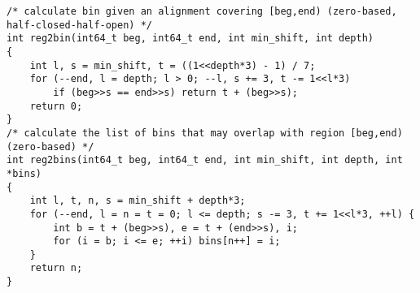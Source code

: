\documentclass[10pt]{article}
\begin{document}
{\footnotesize
\begin{verbatim}
/* calculate bin given an alignment covering [beg,end) (zero-based, half-closed-half-open) */
int reg2bin(int64_t beg, int64_t end, int min_shift, int depth)
{
    int l, s = min_shift, t = ((1<<depth*3) - 1) / 7;
    for (--end, l = depth; l > 0; --l, s += 3, t -= 1<<l*3)
        if (beg>>s == end>>s) return t + (beg>>s);
    return 0;
}
/* calculate the list of bins that may overlap with region [beg,end) (zero-based) */
int reg2bins(int64_t beg, int64_t end, int min_shift, int depth, int *bins)
{
    int l, t, n, s = min_shift + depth*3;
    for (--end, l = n = t = 0; l <= depth; s -= 3, t += 1<<l*3, ++l) {
        int b = t + (beg>>s), e = t + (end>>s), i;
        for (i = b; i <= e; ++i) bins[n++] = i;
    }
    return n;
}
\end{verbatim}
}
\end{document}
